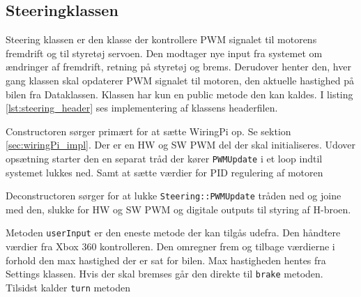 \subsection{Steeringklassen} \label{sec:steering_impl}

Steering klassen er den klasse der kontrollere PWM signalet til motorens fremdrift og til styretøj servoen. 
Den modtager nye input fra systemet om ændringer af fremdrift, retning på styretøj og brems. Derudover henter den, hver gang klassen skal opdaterer PWM signalet til motoren, den aktuelle hastighed på bilen fra Dataklassen. 
Klassen har kun en public metode den kan kaldes. I listing \ref{lst:steering_header} ses implementering af klassens headerfilen.



Constructoren sørger primært for at sætte WiringPi op. Se sektion \ref{sec:wiringPi_impl}. 
Der er en HW og SW PWM del der skal initialiseres. 
Udover opsætning starter den en separat tråd der kører \texttt{PWMUpdate} i et loop indtil systemet lukkes ned. 
Samt at sætte værdier for PID regulering af motoren 




Deconstructoren sørger for at lukke \texttt{Steering::PWMUpdate} tråden ned og joine med den, slukke for HW og SW PWM og digitale outputs til styring af H-broen.



Metoden \texttt{userInput} er den eneste metode der kan tilgås udefra. Den håndtere værdier fra Xbox 360 kontrolleren. Den omregner frem og tilbage værdierne i forhold den max hastighed der er sat for bilen. Max hastigheden hentes fra Settings klassen. Hvis der skal bremses går den direkte til \texttt{brake} metoden. Tilsidst kalder \texttt{turn} metoden

 

